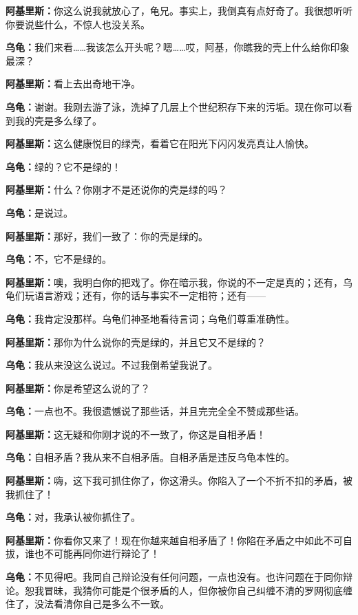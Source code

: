 \documentclass[
  12pt,
  twoside,
  openright,
  oldfontcommands,
]{memoir}
\newcommand{\dialogname}[1]{{\heifamily\bfseries #1}}
\begin{document}
\dialogname{阿基里斯：}你这么说我就放心了，龟兄。事实上，我倒真有点好奇了。我很想听听你要说些什么，不惊人也没关系。

\dialogname{乌龟：}我们来看\ldots\ldots 我该怎么开头呢？嗯\ldots\ldots 哎，阿基，你瞧我的壳上什么给你印象最深？

\dialogname{阿基里斯：}看上去出奇地干净。

\dialogname{乌龟：}谢谢。我刚去游了泳，洗掉了几层上个世纪积存下来的污垢。现在你可以看到我的壳是多么绿了。

\dialogname{阿基里斯：}这么健康悦目的绿壳，看着它在阳光下闪闪发亮真让人愉快。

\dialogname{乌龟：}绿的？它不是绿的！

\dialogname{阿基里斯：}什么？你刚才不是还说你的壳是绿的吗？

\dialogname{乌龟：}是说过。

\dialogname{阿基里斯：}那好，我们一致了：你的壳是绿的。

\dialogname{乌龟：}不，它不是绿的。

\dialogname{阿基里斯：}噢，我明白你的把戏了。你在暗示我，你说的不一定是真的；还有，乌龟们玩语言游戏；还有，你的话与事实不一定相符；还有------

\dialogname{乌龟：}我肯定没那样。乌龟们神圣地看待言词；乌龟们尊重准确性。

\dialogname{阿基里斯：}那你为什么说你的壳是绿的，并且它又不是绿的？

\dialogname{乌龟：}我从来没这么说过。不过我倒希望我说了。

\dialogname{阿基里斯：}你是希望这么说的了？

\dialogname{乌龟：}一点也不。我很遗憾说了那些话，并且完完全全不赞成那些话。

\dialogname{阿基里斯：}这无疑和你刚才说的不一致了，你这是自相矛盾！

\dialogname{乌龟：}自相矛盾？我从来不自相矛盾。自相矛盾是违反乌龟本性的。

\dialogname{阿基里斯：}嗨，这下我可抓住你了，你这滑头。你陷入了一个不折不扣的矛盾，被我抓住了！

\dialogname{乌龟：}对，我承认被你抓住了。

\dialogname{阿基里斯：}你看你又来了！现在你越来越自相矛盾了！你陷在矛盾之中如此不可自拔，谁也不可能再同你进行辩论了！

\dialogname{乌龟：}不见得吧。我同自己辩论没有任何问题，一点也没有。也许问题在于同你辩论。恕我冒昧，我猜你可能是个很矛盾的人，但你被你自己纠缠不清的罗网彻底缠住了，没法看清你自己是多么不一致。
\end{document}
